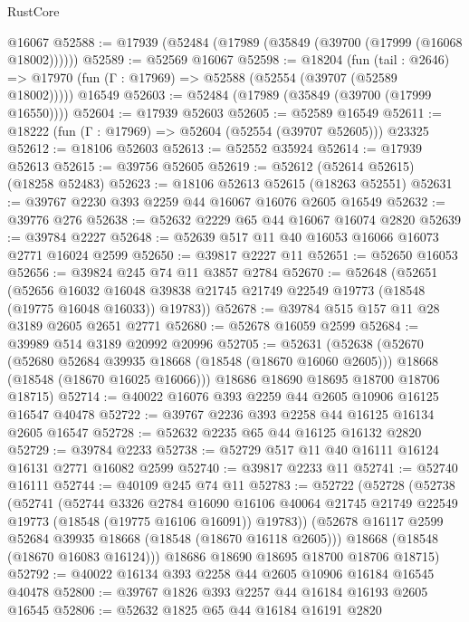 \begin{lexlean}{RustCore}
\begin{coremodule}
    @16067
@52588 := @17939 (@52484 (@17989 (@35849 (@39700 (@17999 (@16068 @18002))))))
@52589 := @52569 @16067
@52598 := @18204
    (fun (tail : @2646) => @17970 (fun (Γ : @17969) => @52588 (@52554 (@39707 (@52589 @18002)))))
    @16549
@52603 := @52484 (@17989 (@35849 (@39700 (@17999 @16550))))
@52604 := @17939 @52603
@52605 := @52589 @16549
@52611 := @18222 (fun (Γ : @17969) => @52604 (@52554 (@39707 @52605))) @23325
@52612 := @18106 @52603
@52613 := @52552 @35924
@52614 := @17939 @52613
@52615 := @39756 @52605
@52619 := @52612 (@52614 @52615) (@18258 @52483)
@52623 := @18106 @52613 @52615 (@18263 @52551)
@52631 := @39767 @2230 @393 @2259 @44 @16067 @16076 @2605 @16549
@52632 := @39776 @276
@52638 := @52632 @2229 @65 @44 @16067 @16074 @2820
@52639 := @39784 @2227
@52648 := @52639 @517 @11 @40 @16053 @16066 @16073 @2771 @16024 @2599
@52650 := @39817 @2227 @11
@52651 := @52650 @16053
@52656 := @39824 @245 @74 @11 @3857 @2784
@52670 := @52648
    (@52651
      (@52656
        @16032
        @16048
        @39838
        @21745
        @21749
        @22549
        @19773
        (@18548 (@19775 @16048 @16033))
        @19783))
@52678 := @39784 @515 @157 @11 @28 @3189 @2605 @2651 @2771
@52680 := @52678 @16059 @2599
@52684 := @39989 @514 @3189 @20992 @20996
@52705 := @52631
    (@52638
      (@52670
        (@52680 @52684 @39935 @18668 (@18548 (@18670 @16060 @2605)))
        @18668
        (@18548 (@18670 @16025 @16066)))
      @18686
      @18690
      @18695
      @18700
      @18706
      @18715)
@52714 := @40022 @16076 @393 @2259 @44 @2605 @10906 @16125 @16547 @40478
@52722 := @39767 @2236 @393 @2258 @44 @16125 @16134 @2605 @16547
@52728 := @52632 @2235 @65 @44 @16125 @16132 @2820
@52729 := @39784 @2233
@52738 := @52729 @517 @11 @40 @16111 @16124 @16131 @2771 @16082 @2599
@52740 := @39817 @2233 @11
@52741 := @52740 @16111
@52744 := @40109 @245 @74 @11
@52783 := @52722
    (@52728
      (@52738
        (@52741
          (@52744
            @3326
            @2784
            @16090
            @16106
            @40064
            @21745
            @21749
            @22549
            @19773
            (@18548 (@19775 @16106 @16091))
            @19783))
        (@52678 @16117 @2599 @52684 @39935 @18668 (@18548 (@18670 @16118 @2605)))
        @18668
        (@18548 (@18670 @16083 @16124)))
      @18686
      @18690
      @18695
      @18700
      @18706
      @18715)
@52792 := @40022 @16134 @393 @2258 @44 @2605 @10906 @16184 @16545 @40478
@52800 := @39767 @1826 @393 @2257 @44 @16184 @16193 @2605 @16545
@52806 := @52632 @1825 @65 @44 @16184 @16191 @2820

\end{coremodule}
\end{lexlean}
